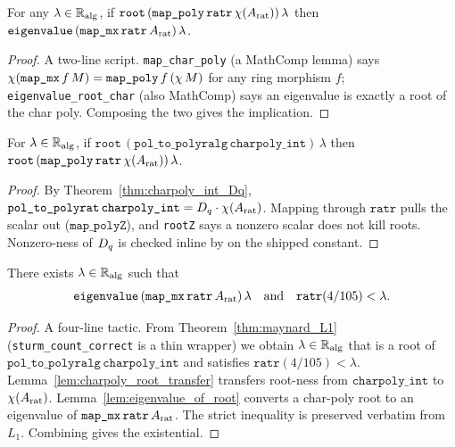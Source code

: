 \begin{lemma}
\label{lem:eigenvalue_of_root}
\rocqok
For any $\lambda \in \mathbb{R}_{\mathrm{alg}}$, if
$\texttt{root}\,(\texttt{map\_poly}\,\texttt{ratr}\,\chi(A_{\mathrm{rat}}))\,\lambda$
then $\texttt{eigenvalue}\,(\texttt{map\_mx}\,\texttt{ratr}\,A_{\mathrm{rat}})\,\lambda$.
\end{lemma}
\begin{proof}\rocqok
A two-line script. \texttt{map\_char\_poly} (a MathComp lemma) says
$\chi(\texttt{map\_mx}\,f\,M) = \texttt{map\_poly}\,f\,(\chi\,M)$
for any ring morphism $f$; \texttt{eigenvalue\_root\_char} (also
MathComp) says an eigenvalue is exactly a root of the char poly.
Composing the two gives the implication.
\end{proof}

\begin{lemma}\label{lem:charpoly_root_transfer}
\rocqok
{}
For $\lambda \in \mathbb{R}_{\mathrm{alg}}$, if
$\texttt{root}\,(\texttt{pol\_to\_polyralg}\,\texttt{charpoly\_int})\,\lambda$
then
$\texttt{root}\,(\texttt{map\_poly}\,\texttt{ratr}\,\chi(A_{\mathrm{rat}}))\,\lambda$.
\end{lemma}
\begin{proof}\rocqok
By Theorem~\ref{thm:charpoly_int_Dq},
$\texttt{pol\_to\_polyrat}\,\texttt{charpoly\_int}
   = D_q \cdot \chi(A_{\mathrm{rat}})$.
Mapping through $\texttt{ratr}$ pulls the scalar out
($\texttt{map\_polyZ}$), and \texttt{rootZ} says a nonzero scalar does
not kill roots. Nonzero-ness of $D_q$ is checked inline by
\vmcompute{} on the shipped constant.
\end{proof}

\begin{theorem}
\label{thm:headline}
\rocqok
{}
There exists $\lambda \in \mathbb{R}_{\mathrm{alg}}$ such that
\[
\texttt{eigenvalue}\,(\texttt{map\_mx}\,\texttt{ratr}\,A_{\mathrm{rat}})\,\lambda
\quad\text{and}\quad
\texttt{ratr}(4/105) < \lambda.
\]
\end{theorem}
\begin{proof}\rocqok
A four-line tactic. From Theorem~\ref{thm:maynard_L1}
(\texttt{sturm\_count\_correct} is a thin wrapper) we obtain
$\lambda \in \mathbb{R}_{\mathrm{alg}}$ that is a root of
$\texttt{pol\_to\_polyralg}\,\texttt{charpoly\_int}$ and satisfies
$\texttt{ratr}(4/105) < \lambda$. Lemma~\ref{lem:charpoly_root_transfer}
transfers root-ness from $\texttt{charpoly\_int}$ to $\chi(A_{\mathrm{rat}})$.
Lemma~\ref{lem:eigenvalue_of_root} converts a char-poly root to an
eigenvalue of $\texttt{map\_mx}\,\texttt{ratr}\,A_{\mathrm{rat}}$. The strict
inequality is preserved verbatim from $L_1$. Combining gives the
existential.
\end{proof}

